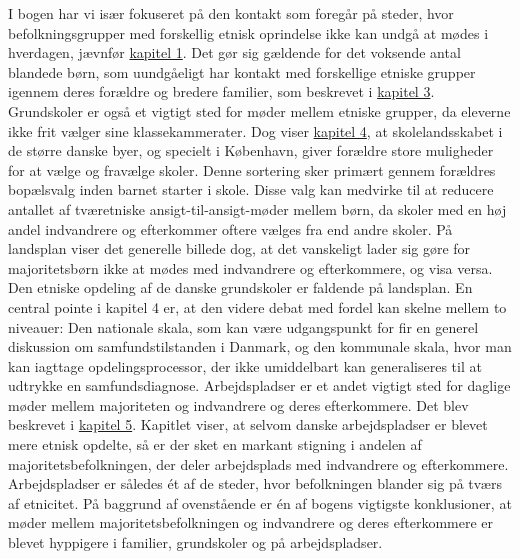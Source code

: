\documentclass[
]{book}
\begin{document}
I bogen har vi især fokuseret på den kontakt som foregår på steder, hvor befolkningsgrupper med forskellig etnisk oprindelse ikke kan undgå at mødes i hverdagen, jævnfør \hyperref[kap1]{kapitel 1}. Det gør sig gældende for det voksende antal blandede børn, som uundgåeligt har kontakt med forskellige etniske grupper igennem deres forældre og bredere familier, som beskrevet i \hyperref[kap3]{kapitel 3}. Grundskoler er også et vigtigt sted for møder mellem etniske grupper, da eleverne ikke frit vælger sine klassekammerater. Dog viser \hyperref[kap4]{kapitel 4}, at skolelandsskabet i de større danske byer, og specielt i København, giver forældre store muligheder for at vælge og fravælge skoler. Denne sortering sker primært gennem forældres bopælsvalg inden barnet starter i skole. Disse valg kan medvirke til at reducere antallet af tværetniske ansigt-til-ansigt-møder mellem børn, da skoler med en høj andel indvandrere og efterkommer oftere vælges fra end andre skoler. På landsplan viser det generelle billede dog, at det vanskeligt lader sig gøre for majoritetsbørn ikke at mødes med indvandrere og efterkommere, og visa versa. Den etniske opdeling af de danske grundskoler er faldende på landsplan. En central pointe i kapitel 4 er, at den videre debat med fordel kan skelne mellem to niveauer: Den nationale skala, som kan være udgangspunkt for fir en generel diskussion om samfundstilstanden i Danmark, og den kommunale skala, hvor man kan iagttage opdelingsprocessor, der ikke umiddelbart kan generaliseres til at udtrykke en samfundsdiagnose. Arbejdspladser er et andet vigtigt sted for daglige møder mellem majoriteten og indvandrere og deres efterkommere. Det blev beskrevet i \hyperref[kap5]{kapitel 5}. Kapitlet viser, at selvom danske arbejdspladser er blevet mere etnisk opdelte, så er der sket en markant stigning i andelen af majoritetsbefolkningen, der deler arbejdsplads med indvandrere og efterkommere. Arbejdspladser er således ét af de steder, hvor befolkningen blander sig på tværs af etnicitet. På baggrund af ovenstående er én af bogens vigtigste konklusioner, at møder mellem majoritetsbefolkningen og indvandrere og deres efterkommere er blevet hyppigere i familier, grundskoler og på arbejdspladser.
\end{document}
